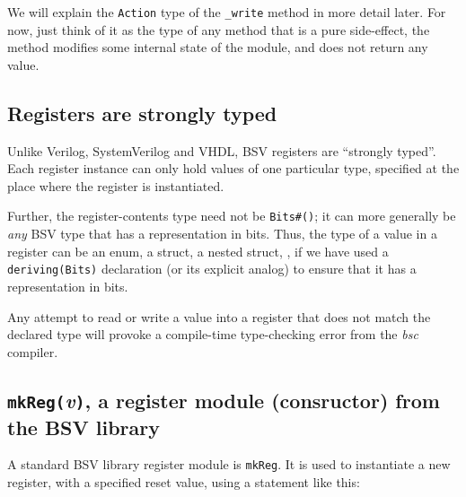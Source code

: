 
We will explain the {\tt Action} type of the {\tt \_write} method in
more detail later.  For now, just think of it as the type of any
method that is a pure side-effect, {\ie} the method modifies some
internal state of the module, and does not return any value.


\subsection{Registers are strongly typed}


Unlike Verilog, SystemVerilog and VHDL, BSV registers are ``strongly
typed''.  Each register instance can only hold values of one
particular type, specified at the place where the register is
instantiated.

Further, the register-contents type need not be \verb|Bits#()|; it can
more generally be \emph{any} BSV type that has a representation in
bits.  Thus, the type of a value in a register can be an enum, a
struct, a nested struct, {\etc}, if we have used a
\verb|deriving(Bits)| declaration (or its explicit analog) to ensure
that it has a representation in bits.

Any attempt to read or write a value into a register that does not
match the declared type will provoke a compile-time type-checking
error from the \emph{bsc} compiler.


\subsection{{\tt mkReg(}\emph{v}{\tt )}, a register module (consructor) from the BSV library}




A standard BSV library register module is \verb|mkReg|.  It is used to
instantiate a new register, with a specified reset value, using a
statement like this:

